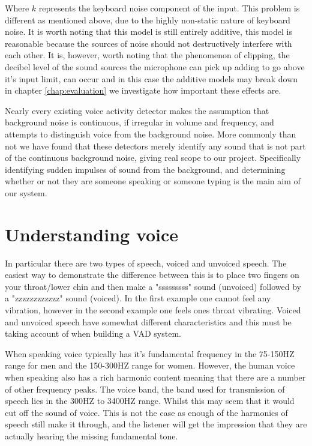 \documentclass[ %
                    author={Sam Phippen},
                supervisor={Dr. Rafal Bogacz},
                     title={Real time voice activity detectors in noisy personal computing environments},
                  subtitle={},
                    degree={MEng},
                      year={2012} ]{thesis}
\begin{document}
Where $k$ represents the keyboard noise component of the input. This problem is
different as mentioned above, due to the highly non-static nature of keyboard
noise. It is worth noting that this model is still entirely additive, this
model is reasonable because the sources of noise should not destructively
interfere with each other. It is, however, worth noting that the phenomenon of
clipping, the decibel level of the sound sources the microphone can pick up
adding to go above it's input limit, can occur and in this case the additive
models may break down in chapter \ref{chap:evaluation} we investigate
how important these effects are.

Nearly every existing voice activity detector makes the assumption that
background noise is continuous, if irregular in volume and frequency, and
attempts to distinguish voice from the background noise. More commonly than not
we have found that these detectors merely identify any sound that is not part
of the continuous background noise, giving real scope to our project.
Specifically identifying sudden impulses of sound from the background, and
determining whether or not they are someone speaking or someone typing is the
main aim of our system.

\section{Understanding voice}

In particular there are two types of speech, voiced and unvoiced speech. The
easiest way to demonstrate the difference between this is to place two fingers
on your throat/lower chin and then make a "sssssssss" sound (unvoiced) followed
by a "zzzzzzzzzzzz" sound (voiced). In the first example one cannot feel any
vibration, however in the second example one feels ones throat vibrating.
Voiced and unvoiced speech have somewhat different characteristics and this
must be taking account of when building a VAD system.

When speaking voice typically has it's fundamental frequency in the 75-150HZ
range for men and the 150-300HZ range for women. However, the human voice when
speaking also has a rich harmonic content meaning that there are a number of
other frequency peaks. The voice band, the band used for transmission of speech
lies in the 300HZ to 3400HZ range. Whilst this may seem that it would cut off
the sound of voice. This is not the case as enough of the harmonics of speech
still make it through, and the listener will get the impression that they are
actually hearing the missing fundamental tone.
\end{document}
